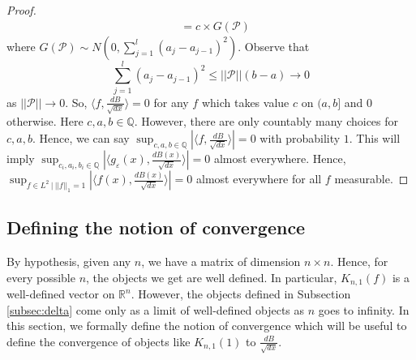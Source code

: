 \documentclass[reqno,12pt]{amsart}
\theoremstyle{plain}
\theoremstyle{definition}
\begin{document}
\begin{proof}
\begin{equation}
\begin{split}
&= c \times G(\mathcal{P})
\end{split}
\end{equation}
where $G(\mathcal{P}) \sim N(0, \sum_{j=1}^{l}(a_{j}-a_{j-1})^2)$. Observe that 
\[
\sum_{j=1}^{l} (a_{j}-a_{j-1})^2\le ||\mathcal{P}||(b-a) \to 0
\] 
as $||\mathcal{P}|| \to 0$. So, $\langle f, \frac{dB}{\sqrt{dx}} \rangle=0$ for any $f$ which takes value $c$ on $(a,b]$ and $0$ otherwise. Here $c,a,b \in \mathbb{Q}$. However, there are only countably many choices for $c,a,b$. Hence, we can say $\sup_{c,a,b \in \mathbb{Q}} \left|\langle f, \frac{dB}{\sqrt{dx}} \rangle\right|=0$ with probability $1$. This will imply $\sup_{c_{i},a_{i},b_{i} \in \mathbb{Q}}\left|\langle g_{\varepsilon}(x), \frac{dB(x)}{\sqrt{dx}} \rangle\right| =0$ almost everywhere. Hence, $\sup_{f \in L^{2}~|~ ||f||_{1}=1}\left|\langle f(x), \frac{dB(x)}{\sqrt{dx}} \rangle\right| =0$ almost everywhere for all $f$ measurable. 
\end{proof} 
\subsection{Defining the notion of convergence}
By hypothesis, given any $n$, we have a matrix of dimension $n \times n$. Hence, for every possible $n$, the objects we get are well defined. In particular, $K_{n,1}(f)$ is a well-defined vector on $\mathbb{R}^n$. However, the objects defined in Subsection \ref{subsec:delta} come only as a limit of well-defined objects as $n$ goes to infinity. In this section, we formally define the notion of convergence which will be useful to define the convergence of objects like $K_{n,1}(1)$ to $\frac{dB}{\sqrt{dx}}$.
\end{document}
